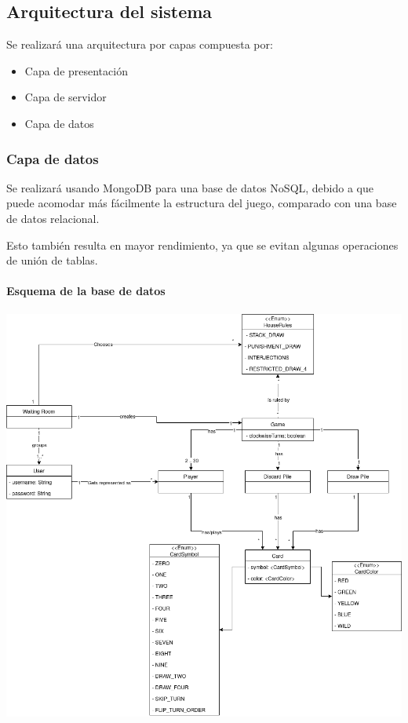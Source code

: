 \subsection{Arquitectura del sistema}

Se realizará una arquitectura por capas compuesta por:

\begin{itemize}
  \item Capa de presentación
  \item Capa de servidor
  \item Capa de datos
\end{itemize}

\subsubsection{Capa de datos}
Se realizará usando MongoDB para una base de datos NoSQL,
debido a que puede acomodar más fácilmente la estructura del juego,
comparado con una base de datos relacional.

Esto también resulta en mayor rendimiento, ya que se evitan algunas operaciones de unión de tablas.

\paragraph{Esquema de la base de datos}

\begin{center}
  \includegraphics[width=1\textwidth]{img/BD_drawio.png}
   \label{fig:dbschema}
\end{center}

